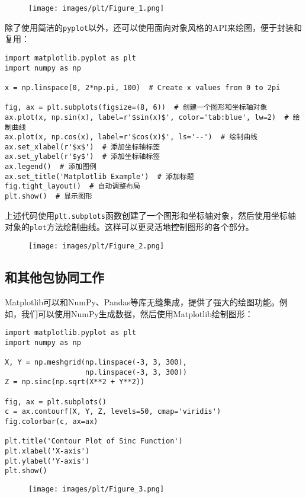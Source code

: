 \documentclass[../main.tex]{subfiles}
\begin{document}
\begin{figure}[htbp]
  \centering
  \texttt{[image: images/plt/Figure\_1.png]}
\end{figure}

除了使用简洁的\texttt{pyplot}以外，还可以使用面向对象风格的API来绘图，便于封装和复用：

\begin{lstlisting}
import matplotlib.pyplot as plt
import numpy as np

x = np.linspace(0, 2*np.pi, 100)  # Create x values from 0 to 2pi

fig, ax = plt.subplots(figsize=(8, 6))  # 创建一个图形和坐标轴对象
ax.plot(x, np.sin(x), label=r'$sin(x)$', color='tab:blue', lw=2)  # 绘制曲线
ax.plot(x, np.cos(x), label=r'$cos(x)$', ls='--')  # 绘制曲线
ax.set_xlabel(r'$x$')  # 添加坐标轴标签
ax.set_ylabel(r'$y$')  # 添加坐标轴标签
ax.legend()  # 添加图例
ax.set_title('Matplotlib Example')  # 添加标题
fig.tight_layout()  # 自动调整布局
plt.show()  # 显示图形
\end{lstlisting}
上述代码使用\texttt{plt.subplots}函数创建了一个图形和坐标轴对象，然后使用坐标轴对象的\texttt{plot}方法绘制曲线。这样可以更灵活地控制图形的各个部分。

\begin{figure}[htbp]
  \centering
  \texttt{[image: images/plt/Figure\_2.png]}
\end{figure}

\subsection{和其他包协同工作}

Matplotlib可以和NumPy、Pandas等库无缝集成，提供了强大的绘图功能。例如，我们可以使用NumPy生成数据，然后使用Matplotlib绘制图形：
\begin{lstlisting}
import matplotlib.pyplot as plt
import numpy as np

X, Y = np.meshgrid(np.linspace(-3, 3, 300),
                   np.linspace(-3, 3, 300))
Z = np.sinc(np.sqrt(X**2 + Y**2))

fig, ax = plt.subplots()
c = ax.contourf(X, Y, Z, levels=50, cmap='viridis')
fig.colorbar(c, ax=ax)

plt.title('Contour Plot of Sinc Function')
plt.xlabel('X-axis')
plt.ylabel('Y-axis')
plt.show()
\end{lstlisting}

\begin{figure}
  \centering
  \texttt{[image: images/plt/Figure\_3.png]}
\end{figure}
\end{document}
